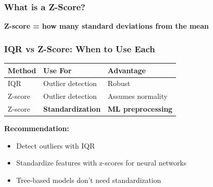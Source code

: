 \documentclass[notes]{beamer}
\begin{document}
\begin{frame}
\frametitle{What is a Z-Score?}

\textbf{Z-score = how many standard deviations from the mean}


\end{frame}

\begin{frame}
\frametitle{IQR vs Z-Score: When to Use Each}

\begin{center}
\begin{tabular}{lll}
\toprule
\textbf{Method} & \textbf{Use For} & \textbf{Advantage} \\
\midrule
IQR & Outlier detection & Robust \\
Z-score & Outlier detection & Assumes normality \\
Z-score & \textbf{Standardization} & \textbf{ML preprocessing} \\
\bottomrule
\end{tabular}
\end{center}

\vspace{1em}

\textbf{Recommendation:}
\begin{itemize}
\item Detect outliers with IQR
\item Standardize features with z-scores for neural networks
\item Tree-based models don't need standardization
\end{itemize}

\end{frame}
\end{document}
